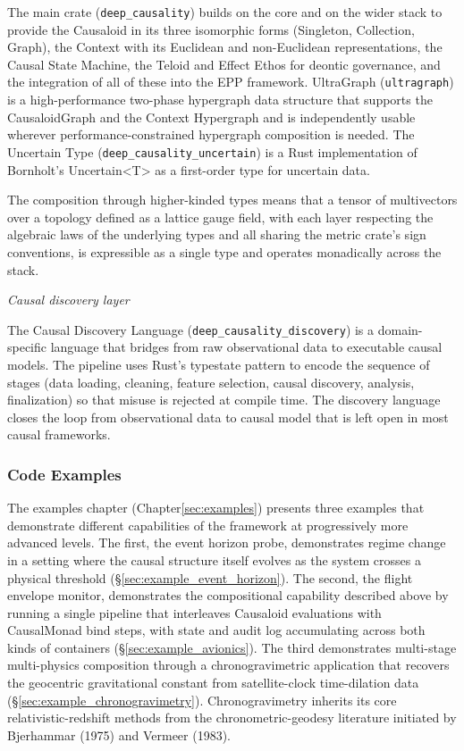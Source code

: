 The main crate (\texttt{deep\_causality}) builds on the core and on the wider stack to provide the Causaloid in its three isomorphic forms (Singleton, Collection, Graph), the Context with its Euclidean and non-Euclidean representations, the Causal State Machine, the Teloid and Effect Ethos for deontic governance, and the integration of all of these into the EPP framework. UltraGraph (\texttt{ultragraph}) is a high-performance two-phase hypergraph data structure that supports the CausaloidGraph and the Context Hypergraph and is independently usable wherever performance-constrained hypergraph composition is needed. The Uncertain Type (\texttt{deep\_causality\_uncertain}) is a Rust implementation of Bornholt's Uncertain<T> as a first-order type for uncertain data\cite{bornholt2014uncertain}.

The composition through higher-kinded types means that a tensor of multivectors over a topology defined as a lattice gauge field, with each layer respecting the algebraic laws of the underlying types and all sharing the metric crate's sign conventions, is expressible as a single type and operates monadically across the stack.
 
 \textit{Causal discovery layer} 
 
The Causal Discovery Language (\texttt{deep\_causality\_discovery}) is a domain-specific language that bridges from raw observational data to executable causal models. The pipeline uses Rust's typestate pattern to encode the sequence of stages (data loading, cleaning, feature selection, causal discovery, analysis, finalization) so that misuse is rejected at compile time. The discovery language closes the loop from observational data to causal model that is left open in most causal frameworks.
 
  
\subsubsection{Code Examples}

The examples chapter (Chapter\ref{sec:examples}) presents three examples that demonstrate different capabilities of the framework at progressively more advanced levels. The first, the event horizon probe, demonstrates regime change in a setting where the causal structure itself evolves as the system crosses a physical threshold (§\ref{sec:example_event_horizon}). The second, the flight envelope monitor, demonstrates the compositional capability described above by running a single pipeline that interleaves Causaloid evaluations with CausalMonad bind steps, with state and audit log accumulating across both kinds of containers (§\ref{sec:example_avionics}). The third demonstrates multi-stage multi-physics composition through a chronogravimetric application that recovers the geocentric gravitational constant from satellite-clock time-dilation data (§\ref{sec:example_chronogravimetry}). Chronogravimetry inherits its core relativistic-redshift methods from the chronometric-geodesy literature initiated by Bjerhammar (1975) and Vermeer (1983). 




